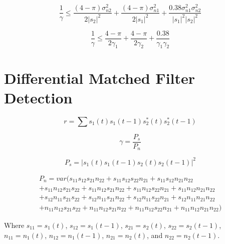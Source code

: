 \documentclass[11pt]{article}
\begin{document}
\begin{equation}
\frac{1}{\gamma}
\leq
\frac{\left( 4-\pi \right) \sigma_{n2}^2}
{2|s_2|^2}
+
\frac{\left( 4-\pi \right) \sigma_{n1}^2}
{2|s_1|^2}
+
\frac{0.38\sigma_{n1}^2 \sigma_{n2}^2}
{|s_1|^2|s_2|^2}
\end{equation}


\begin{equation}
\boxed{
\frac{1}{\gamma}
\leq
\frac{4-\pi}
{2 \gamma_1}
+
\frac{4-\pi}
{2 \gamma_2}
+
\frac{0.38}
{\gamma_1 \gamma_2}
}
\end{equation}


\section{Differential Matched Filter Detection}


\begin{equation}
r = \sum s_1(t)s_1(t-1) s_2^*(t) s_2^*(t-1)
\end{equation}


\begin{equation}
\gamma
=
\frac{P_s}{P_n}
\end{equation}

\begin{equation}
P_s = |s_1(t)s_1(t-1)s_2(t)s_2(t-1)|^2
\end{equation}

\begin{align}
P_n = var(s_{11}s_{12}s_{21}n_{22} + s_{11}s_{12}s_{22}n_{21} + s_{11}s_{12}n_{21}n_{22}\\
  + s_{11}n_{12}s_{21}s_{22} + s_{11}n_{12}s_{21}n_{22} + s_{11}n_{12}s_{22}n_{21} + s_{11}n_{12}n_{21}n_{22}\\
  + s_{12}n_{11}s_{21}s_{22} + s_{12}n_{11}s_{21}n_{22} + s_{12}n_{11}s_{22}n_{21} + s_{12}n_{11}n_{21}n_{22}\\
  + n_{11}n_{12}s_{21}s_{22} + n_{11}n_{12}s_{21}n_{22} + n_{11}n_{12}s_{22}n_{21} + n_{11}n_{12}n_{21}n_{22})
\end{align}

Where $s_{11} = s_1(t)$, $s_{12} = s_1(t-1)$, $s_{21} = s_2(t)$, $s_{22} = s_2(t-1)$, $n_{11} = n_1(t)$, $n_{12} = n_1(t-1)$, $n_{21} = n_2(t)$, and $n_{22} = n_2(t-1)$.


\end{document}
